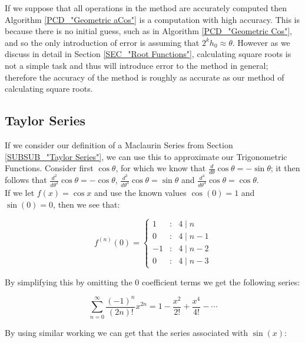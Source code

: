{If we suppose that all operations in the method are accurately computed then Algorithm \ref{PCD_"Geometric aCos"} is a computation with high accuracy. This is because there is no initial guess, such as in Algorithm \ref{PCD_"Geometric Cos"}, and so the only introduction of error is assuming that \(2^kh_0 \approx \theta\). However as we discuss in detail in Section \ref{SEC_"Root Functions"}, calculating square roots is not a simple task and thus will introduce error to the method in general; therefore the accuracy of the method is roughly as accurate as our method of calculating square roots.

\subsection{Taylor Series}
\label{SUB_"Taylor Series Trig"}

If we consider our definition of a Maclaurin Series from Section \ref{SUBSUB_"Taylor Series"}, we can use this to approximate our Trigonometric Functions. Consider first \(\cos\theta\), for which we know that \(\frac{d}{d\theta}\cos\theta = - \sin\theta\); it then follows that \(\frac{d^2}{d\theta^2}\cos\theta = -\cos\theta\), \(\frac{d^3}{d\theta^3} \cos\theta = \sin\theta\) and \(\frac{d^4}{d\theta^4} \cos\theta = \cos\theta\).\\

If we let \(f(x) = \cos x\) and use the known values \(\cos(0) = 1\) and \(\sin(0) = 0\), then we see that:

\begin{displaymath}
	f^{(n)}(0) = \left\{
		\begin{array}{rcl}
			1 &:& 4 \mid n\\
			0 &:& 4 \mid n-1\\
			-1 &:& 4 \mid n-2\\
			0 &:& 4 \mid n-3
		\end{array}\right.
\end{displaymath}

By simplifying this by omitting the \(0\) coefficient terms we get the following series:

\begin{equation}
\label{EQN_"Cos Series Formula"}
\sum_{n=0}^\infty \frac{(-1)^n}{(2n)!}x^{2n} = 1 - \frac{x^2}{2!} + \frac{x^4}{4!} - \cdots
\end{equation}

By using similar working we can get that the series associated with \(\sin(x)\):

}
